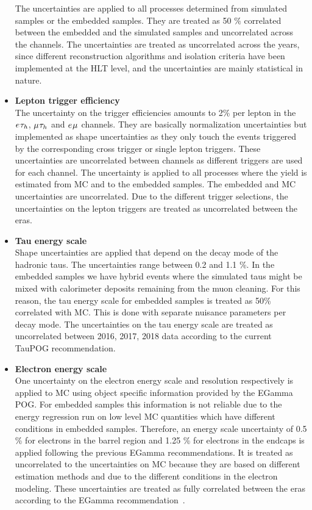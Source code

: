 \begin{itemize}
The uncertainties are applied to all processes determined from simulated samples or the embedded samples.
They are treated as 50 $\%$ correlated between the embedded and the simulated samples and uncorrelated across the channels.
The uncertainties are treated as uncorrelated across the years, since different reconstruction algorithms and isolation criteria have been implemented at the HLT level, and the uncertainties are mainly statistical in nature.

\item {\bf Lepton trigger efficiency} \\
The uncertainty on the trigger efficiencies amounts to 2\% per lepton in the $e_{}\tau_{h}$, $\mu_{}\tau_{h}$ and $e_{}\mu_{}$ channels.
They are basically normalization uncertainties but implemented as shape uncertainties as they only touch the events triggered by the corresponding cross trigger or single lepton triggers.
These uncertainties are uncorrelated between channels as different triggers are used for each channel. The uncertainty is applied to all processes where the yield is estimated from MC and to the embedded samples. The embedded and MC uncertainties are uncorrelated.
Due to the different trigger selections, the uncertainties on the lepton triggers are treated as uncorrelated between the eras.

\item \textbf{Tau energy scale}\\
Shape uncertainties are applied that depend on the decay mode of the hadronic taus. The uncertainties range between 0.2 and 1.1 \%. 
In the embedded samples we have hybrid events where the simulated taus might be mixed with calorimeter deposits remaining from the muon cleaning.
For this reason, the tau energy scale for embedded samples is treated as 50\% correlated with MC.
This is done with separate nuisance parameters per decay mode.
The uncertainties on the tau energy scale are treated as uncorrelated between 2016, 2017, 2018 data according to the current TauPOG recommendation.

\item \textbf{Electron energy scale}\\
One uncertainty on the electron energy scale and resolution respectively is applied to MC using object specific information provided by the EGamma POG.
For embedded samples this information is not reliable due to the energy regression run on low level MC quantities which have different conditions in embedded samples. Therefore, an energy scale uncertainty of 0.5 \% for electrons in the barrel region and 1.25 \% for electrons in the endcaps is applied following the previous EGamma recommendations.
It is treated as uncorrelated to the uncertainties on MC because they are based on different estimation methods and due to the different conditions in the electron modeling.
These uncertainties are treated as fully correlated between the eras according to the EGamma recommendation~\cite{EGammaRunII}.


\end{itemize}
